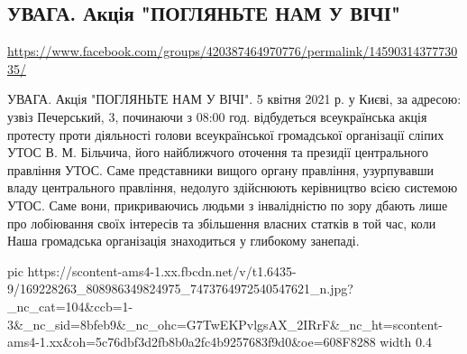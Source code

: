  
 
 
 
 

\subsection{УВАГА. Акція "ПОГЛЯНЬТЕ НАМ У ВІЧІ"}
\label{sec:05_04_2021.fb.romancha_viktoria.1.svet_glaza_prozrenie}
\url{https://www.facebook.com/groups/420387464970776/permalink/1459031437773035/}

УВАГА. Акція "ПОГЛЯНЬТЕ НАМ У ВІЧІ". 5 квітня 2021 р. у Києві, за адресою: узвіз Печерський, 3, починаючи з 08:00 год. відбудеться всеукраїнська акція протесту проти діяльності голови всеукраїнської громадської організації сліпих УТОС В. М. Більчича, його найближчого оточення та президії центрального правління УТОС. Саме представники вищого органу правління, узурпувавши владу центрального правління, недолуго здійснюють керівництво всією системою УТОС. Саме вони, прикриваючись людьми з інвалідністю по зору дбають лише про лобіювання своїх інтересів та збільшення власних статків в той час, коли Наша громадська організація знаходиться у глибокому занепаді.


\ifcmt
  pic https://scontent-ams4-1.xx.fbcdn.net/v/t1.6435-9/169228263_808986349824975_7473764972540547621_n.jpg?_nc_cat=104&ccb=1-3&_nc_sid=8bfeb9&_nc_ohc=G7TwEKPvlgsAX_2IRrF&_nc_ht=scontent-ams4-1.xx&oh=5c76dbf3d2fb8b0a2fc4b9257683f9d0&oe=608F8288
  width 0.4
\fi


